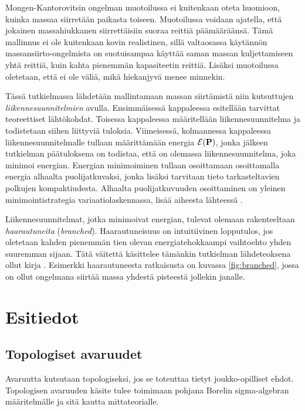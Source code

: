 \documentclass[12pt,oneside,a4paper]{amsbook} %
\begin{document}
Mongen-Kantorovitsin ongelman muotoilussa ei kuitenkaan oteta huomioon, kuinka massaa siirretään paikasta toiseen. Muotoilussa voidaan ajatella, että jokainen massahiukkanen siirrettäisiin suoraa reittiä päämääräänsä. Tämä mallinnus ei ole kuitenkaan kovin realistinen, sillä valtaosassa käytännön massansiirto-ongelmista on suotuisampaa käyttää saman massan kuljettamiseen yhtä reittiä, kuin kahta pienemmän kapasiteetin reittiä. Lisäksi muotoilussa oletetaan, että ei ole väliä, mikä hiekanjyvä menee minnekin. 

Tässä tutkielmassa lähdetään mallintamaan massan siirtämistä niin kutsuttujen \textit{liikennesuunnitelmien} avulla. Ensimmäisessä kappaleessa esitellään tarvittat teoreettiset lähtökohdat. Toisessa kappaleessa määritellään liikennesuunnitelma ja todistetaan siihen liittyviä tuloksia. Viimeisessä, kolmannessa kappaleessa liikennesuunnitelmalle tullaan määrittämään energia $\mathcal{E}(\mathbf{P})$, jonka jälkeen tutkielman päätuloksena on todistaa, että on olemassa liikennesuunnitelma, joka minimoi energian. Energian minimoiminen tullaan osoittamaan osoittamalla energia alhaalta puolijatkuvaksi, jonka lisäksi tarvitaan tieto tarkasteltavien polkujen kompaktiudesta. Alhaalta puolijatkuvuuden osoittaminen on yleinen minimointistrategia variaatiolaskennassa, lisää aiheesta lähteessä \cite{benesova}.

Liikennesuunnitelmat, jotka minimoivat energian, tulevat olemaan rakenteeltaan \textit{haarautuneita} (\textit{branched}). Haarautuneisuus on intuitiivinen lopputulos, jos oletetaan kahden pienemmän tien olevan energiatehokkaampi vaihtoehto yhden suuremman sijaan. Tätä väitettä käsittelee tämänkin tutkielman lähdeteoksena ollut kirja \cite{optimal}. Esimerkki haarautuneesta ratkaisusta on kuvassa \ref{fig:branched}, jossa on ollut ongelmana siirtää massa yhdestä pisteestä jollekin janalle.








\chapter{Esitiedot}

\section{Topologiset avaruudet}
Avaruutta kutsutaan topologiseksi, jos se toteuttaa tietyt joukko-opilliset ehdot. Topologisen avaruuden käsite tulee toimimaan pohjana Borelin sigma-algebran määritelmälle ja sitä kautta mittateorialle.
\end{document}
